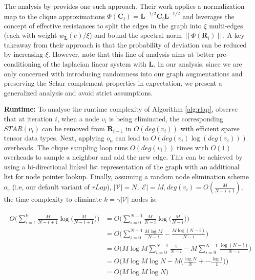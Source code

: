 \documentclass{article}
\newcommand{\norm}[1]{\left\lVert#1\right\rVert}
\def\mC{{\mathbf{C}}}
\def\mL{{\mathbf{L}}}
\def\mR{{\mathbf{R}}}
\def\gE{{\mathcal{E}}}
\def\gV{{\mathcal{V}}}
\theoremstyle{plain}
\theoremstyle{definition}
\theoremstyle{remark}
\begin{document}
The analysis by \citet{kyng2016approximate, tropp2019matrix} provides one such approach. Their work applies a normalization map to the clique approximations $ \Phi(\mC_i) = \mL^{-1/2}\mC_i\mL^{-1/2}$ and leverages the concept of effective resistances \citep{spielman2008graph} to split the edges in the graph into $\xi$ multi-edges (each with weight $w_{\mL}(e)/\xi$) and bound the spectral norm $\norm{\Phi(\mR_{i})}$. A key takeaway from their approach is that the probability of deviation can be reduced by increasing $\xi$. However, note that this line of analysis aims at better pre-conditioning of the laplacian linear system with $\mL$. In our analysis, since we are only concerned with introducing randomness into our graph augmentations and preserving the Schur complement properties in expectation, we present a generalized analysis and avoid strict assumptions.


\textbf{Runtime:} To analyse the runtime complexity of Algorithm \ref{alg:rlap}, observe that at iteration $i$, when a node $v_i$ is being eliminated, the corresponding $\textit{STAR}(v_i)$ can be removed from $\mR_{i-1}$ in $O(deg(v_i))$ with efficient sparse tensor data types. Next, applying $o_n$ can lead to $O(deg(v_i)\log(deg(v_i)))$ overheads. The clique sampling loop runs $O(deg(v_i))$ times with $O(1)$ overheads to sample a neighbor and add the new edge. This can be achieved by using a bi-directional linked list representation of the graph with an additional list for node pointer lookup. Finally, assuming a random node elimination scheme $o_v$ (i.e, our default variant of $rLap$), $|\gV|=N, |\gE|=M, deg(v_i)=O(\frac{M}{N-i+1})$, the time complexity to eliminate $k = \gamma|\gV|$ nodes is:

\begin{align*}
\begin{split}
    O \bigg( \sum_{i=1}^k \frac{M}{N - i+1} \log \big(\frac{M}{N - i+1} \big) \bigg) 
    &= O \bigg( \sum_{i=0}^{N-1} \frac{M}{N - i} \log \big(\frac{M}{N - i} \big) \bigg) \\
    &= O \bigg( \sum_{i=0}^{N-1} \frac{M \log M}{N - i} - \frac{M \log (N - i)}{N - i} \bigg)
    \\ &= O \bigg( M \log M \sum_{i=0}^{N-1} \frac{1}{N - i} - M \sum_{i=0}^{N-1} \frac{\log (N - i)}{N - i} \bigg) \\
    &=  O \bigg( M \log M \log N - M \big( \frac{\log N}{N} + \cdots \frac{\log 1}{1} \big) \bigg) \\
    &= O \bigg( M \log M \log N \bigg) 
\end{split}
\end{align*}
\end{document}
